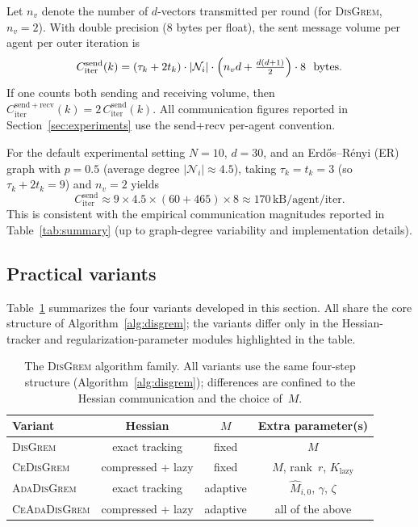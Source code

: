 \documentclass[review,onefignum,onetabnum]{siamart171218}
\begin{document}
Let $n_v$ denote the number of $d$-vectors transmitted per round (for \textsc{DisGrem}, $n_v=2$).
With double precision (8 bytes per float), the sent message volume per agent per outer iteration is
\begin{equation}\label{eq:comm_cost_iter}
	C_{\mathrm{iter}}^{\mathrm{send}}(k)
	= (\tau_k+2t_k)\cdot |\mathcal N_i|\cdot \Bigl(n_v d + \tfrac{d(d+1)}{2}\Bigr)\cdot 8 \ \ \text{bytes}.
\end{equation}
If one counts both sending and receiving volume, then
$C_{\mathrm{iter}}^{\mathrm{send+recv}}(k)=2\,C_{\mathrm{iter}}^{\mathrm{send}}(k)$.
All communication figures reported in Section~\ref{sec:experiments}
use the send+recv per-agent convention.

For the default experimental setting $N{=}10$, $d{=}30$, and an Erd\H{o}s--R\'enyi (ER)
graph with $p{=}0.5$ (average degree $|\mathcal N_i|\approx 4.5$),
taking $\tau_k=t_k=3$ (so $\tau_k+2t_k=9$) and $n_v=2$ yields
\[
C_{\mathrm{iter}}^{\mathrm{send}}\!\approx\! 9\!\times\! 4.5\!\times\!(60\!+\!465)\!\times\! 8
\!\approx\! 170\,\text{kB/agent/iter}.
\]
This is consistent with the empirical communication magnitudes reported in
Table~\ref{tab:summary} (up to graph-degree variability and implementation details).
	
	\subsection{Practical variants}\label{ssec:variants}

	Table~\ref{tab:family} summarizes the four variants developed in this
	section.
	All share the core structure of Algorithm~\ref{alg:disgrem};
	the variants differ only in the Hessian-tracker and
	regularization-parameter modules highlighted in the table.

	\begin{table}[htbp]
		\centering
		\caption{The \textsc{DisGrem} algorithm family.
			All variants use the same four-step structure (Algorithm~\ref{alg:disgrem});
			differences are confined to the Hessian communication and the choice of~$M$.}
		\label{tab:family}
		\setlength{\tabcolsep}{4pt}
		\small
		\begin{tabular}{lccc}
			\toprule
			Variant & Hessian & $M$ & Extra parameter(s) \\
			\midrule
			\textsc{DisGrem}       & exact tracking       & fixed  & $M$ \\
			\textsc{CeDisGrem}     & compressed + lazy     & fixed  & $M$, rank~$r$, $K_{\mathrm{lazy}}$ \\
			\textsc{AdaDisGrem}    & exact tracking       & adaptive & $\hat M_{i,0}$, $\gamma$, $\zeta$ \\
			\textsc{CeAdaDisGrem}  & compressed + lazy     & adaptive & all of the above \\
			\bottomrule
		\end{tabular}
	\end{table}
\end{document}
